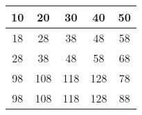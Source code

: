 \documentclass[12pt]{article}
\begin{document}
\begin{tabular}{|c|c|c| c|c|}
\hline
10  & 20  & 30  & 40  & 50 \\ \hline
18  & 28  & 38  & 48  & 58 \\ \hline	
28  & 38  & 48  & 58  & 68 \\ \hline
98  & 108 & 118 & 128 & 78 \\ \hline
98  & 108 & 118 & 128 & 88 \\ \hline

\end{tabular}
\end{document}
